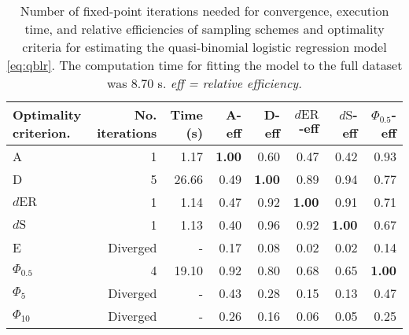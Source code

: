 \begin{table}[htb!]
\centering
\caption{Number of fixed-point iterations needed for convergence, execution time, and relative efficiencies of sampling schemes and optimality criteria for estimating the quasi-binomial logistic regression model \eqref{eq:qblr}. The computation time for fitting the model to the full dataset was 8.70 s. \textit{eff = relative efficiency.}} 
\label{tab:impact_speed_response_surface}
\begin{tabular}{lrrrrrrr}
 Optimality criterion. & No. iterations & Time (s) & A-eff & D-eff & $d{\mathrm{ER}}$-eff & $d{\mathrm{S}}$-eff & $\Phi_{0.5}$-eff \\ 
  \hline
A & 1 & 1.17 & \textbf{1.00} & 0.60 & 0.47 & 0.42 & 0.93 \\ 
  D & 5 & 26.66 & 0.49 & \textbf{1.00} & 0.89 & 0.94 & 0.77 \\ 
  $d{\mathrm{ER}}$ & 1 & 1.14 & 0.47 & 0.92 & \textbf{1.00} & 0.91 & 0.71 \\ 
  $d{\mathrm{S}}$ & 1 & 1.13 & 0.40 & 0.96 & 0.92 & \textbf{1.00} & 0.67 \\ 
  E & Diverged & - & 0.17 & 0.08 & 0.02 & 0.02 & 0.14 \\ 
  $\Phi_{0.5}$ & 4 & 19.10 & 0.92 & 0.80 & 0.68 & 0.65 & \textbf{1.00} \\ 
  $\Phi_5$ & Diverged & - & 0.43 & 0.28 & 0.15 & 0.13 & 0.47 \\ 
  $\Phi_{10}$ & Diverged & - & 0.26 & 0.16 & 0.06 & 0.05 & 0.25 \\ 
   \hline
\end{tabular}
\end{table}
